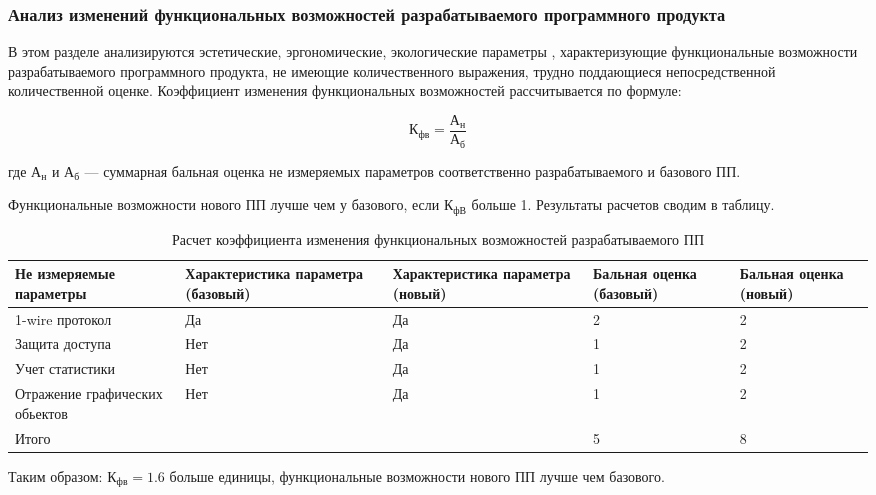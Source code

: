 \subsubsection{Анализ изменений функциональных возможностей разрабатываемого программного продукта}
\begin{par}
В этом разделе анализируются  эстетические, эргономические,
экологические параметры , характеризующие функциональные возможности 
разрабатываемого программного продукта, не имеющие количественного 
выражения, трудно поддающиеся непосредственной количественной оценке.
Коэффициент изменения функциональных возможностей рассчитывается
по  формуле:
\end{par}


\begin{equation}
	К_{фв} = \frac{А_{н}}{А_{б}}
\end{equation}
\begin{ESKDexplanation}
	\item[где ]{} $А_{н}$ и $А_{б}$ --- суммарная бальная оценка не измеряемых параметров соответственно разрабатываемого и базового ПП.
\end{ESKDexplanation}
Функциональные возможности нового ПП лучше чем у базового, если $К_{фВ}$  больше 1.
Результаты расчетов сводим в таблицу.

\begin{table}[H]
\caption{Расчет коэффициента изменения функциональных возможностей разрабатываемого ПП}
\begin{tabular}{|p{3cm}|p{3cm}|p{3cm}|p{3cm}|p{3cm}|}
\hline{}
Не измеряемые параметры & Характе\-ристика параметра (базовый) & Характе\-ристика параметра (новый) & Бальная оценка (базовый) & Бальная оценка (новый) \\
\hline{}
1-wire протокол & Да & Да & 2 & 2 \\
\hline{}
Защита доступа & Нет & Да & 1 & 2 \\
\hline{}
Учет статистики & Нет & Да & 1 & 2 \\
\hline{}
Отражение графических обьектов & Нет & Да & 1 & 2 \\
\hline{}
Итого & & & 5 & 8 \\
\hline
\end{tabular}
\label{table:calcKoefFuncChanges}
\end{table}

Таким образом: $К_{фв} = 1.6$  больше единицы, функциональные возможности нового ПП лучше чем базового.



